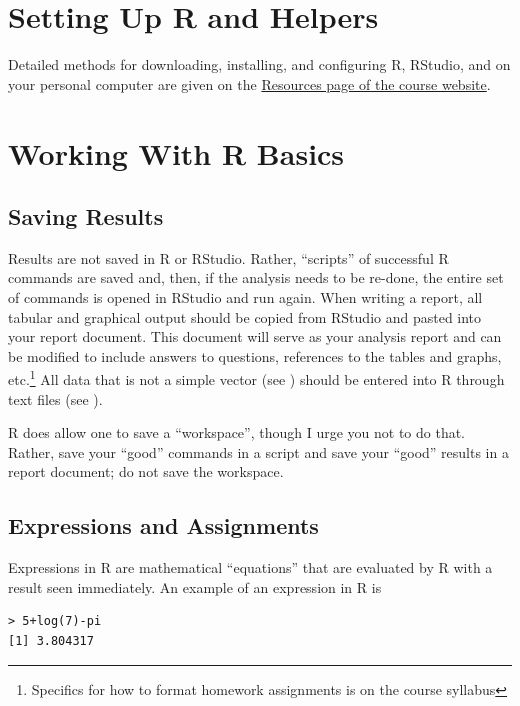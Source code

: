 \documentclass[10pt,openany]{book}\usepackage[]{graphicx}\usepackage[]{color}
\makeatletter
\newenvironment{kframe}{%
 \def\at@end@of@kframe{}%
 \ifinner\ifhmode%
  \def\at@end@of@kframe{\end{minipage}}%
  \begin{minipage}{\columnwidth}%
 \fi\fi%
 \def\FrameCommand##1{\hskip\@totalleftmargin \hskip-\fboxsep
 \colorbox{shadecolor}{##1}\hskip-\fboxsep
     \hskip-\linewidth \hskip-\@totalleftmargin \hskip\columnwidth}%
 \MakeFramed {\advance\hsize-\width
   \@totalleftmargin\z@ \linewidth\hsize
   \@setminipage}}%
 {\par\unskip\endMakeFramed%
 \at@end@of@kframe}
\newenvironment{knitrout}{}{} %
\makeatother
\begin{document}
\minitoc
\newpage

\section{Setting Up R and Helpers} \label{sect:RSetup}
\vspace{-8pt}
Detailed methods for downloading, installing, and configuring R, RStudio, and  on your personal computer are given on the \href{http://derekogle.com/NCMTH107/resources/}{Resources page of the course website}.

\vspace{-8pt}
\section{Working With R Basics} \label{sect:RBasics}
\vspace{-12pt}
\subsection{Saving Results} \label{sect:RSaving}
Results are not saved in R or RStudio.  Rather, ``scripts'' of successful R commands are saved and, then, if the analysis needs to be re-done, the entire set of commands is opened in RStudio and run again.  When writing a report, all tabular and graphical output should be copied from RStudio and pasted into your report document.  This document will serve as your analysis report and can be modified to include answers to questions, references to the tables and graphs, etc.\footnote{Specifics for how to format homework assignments is on the course syllabus}  All data that is not a simple vector (see ) should be entered into R through text files (see ).

R does allow one to save a ``workspace'', though I urge you not to do that.  Rather, save your ``good'' commands in a script and save your ``good'' results in a report document; do not save the workspace.


\vspace{-8pt}
\subsection{Expressions and Assignments} \label{sect:RExprAssn}
\vspace{-8pt}
Expressions in R are mathematical ``equations'' that are evaluated by R with a result seen immediately.  An example of an expression in R is
\begin{knitrout}
\color{fgcolor}\begin{kframe}
\begin{verbatim}
> 5+log(7)-pi
[1] 3.804317
\end{verbatim}
\end{kframe}
\end{knitrout}
\end{document}
